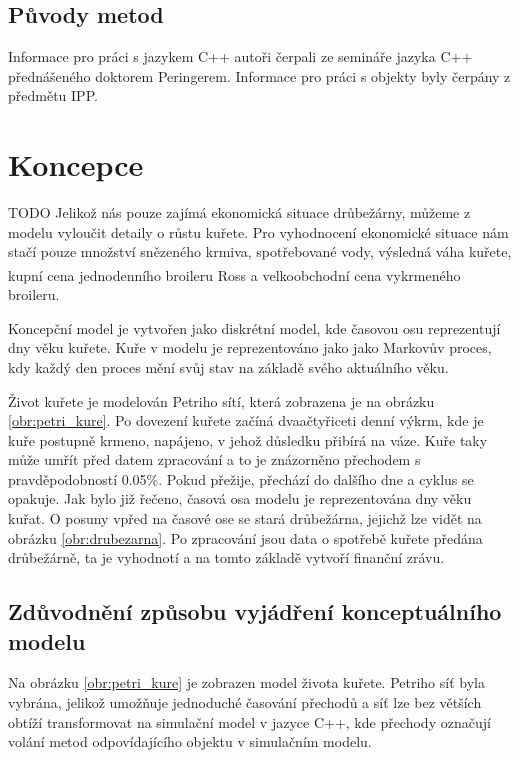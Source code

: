 \documentclass[a4paper,10pt]{article}
\begin{document}
\subsection{Původy metod}\label{puvod}
Informace pro práci s jazykem C++ autoři čerpali ze semináře jazyka C++\cite{cpp}
přednášeného doktorem Peringerem. Informace pro práci s objekty byly čerpány
z předmětu IPP\cite{ipp}.





\section{Koncepce}\label{koncepce}
TODO
Jelikož nás pouze zajímá ekonomická situace drůbežárny, můžeme z modelu vyloučit detaily
o růstu kuřete. Pro vyhodnocení ekonomické situace nám stačí pouze množství snězeného krmiva,
spotřebované vody, výsledná váha kuřete, kupní cena jednodenního broileru Ross\textsuperscript\textregistered
a velkoobchodní cena vykrmeného broileru.
\par
Koncepční model\cite{concept_model} je vytvořen jako diskrétní model, kde časovou osu reprezentují dny věku kuřete.
Kuře v modelu je reprezentováno jako jako Markovův proces\cite{markovuv_proces},
kdy každý den proces mění svůj stav na základě svého aktuálního věku.
\par
Život kuřete je modelován Petriho sítí, která zobrazena je na obrázku \ref{obr:petri_kure}.
Po dovezení kuřete začíná dvaačtyřiceti denní výkrm, kde je kuře postupně krmeno, napájeno, v jehož důsledku
přibírá na váze. Kuře taky může umřít před datem zpracování a to je znázorněno přechodem\cite{prechod} s pravděpodobností 0.05\%.
Pokud přežije, přechází do dalšího dne a cyklus se opakuje. Jak bylo již řečeno, časová osa modelu je reprezentována dny
věku kuřat. O posuny vpřed na časové ose se stará drůbežárna, jejichž lze vidět na obrázku \ref{obr:drubezarna}. 
Po zpracování jsou data o spotřebě kuřete předána drůbežárně, ta je vyhodnotí a na tomto základě vytvoří finanční zrávu.

\subsection{Zdůvodnění způsobu vyjádření konceptuálního modelu}
Na obrázku \ref{obr:petri_kure} je zobrazen model života kuřete. Petriho síť byla vybrána, jelikož umožňuje
jednoduché časování přechodů a síť lze bez větších obtíží transformovat na simulační model v jazyce C++, kde přechody
označují volání metod odpovídajícího objektu v simulačním modelu.
\end{document}
